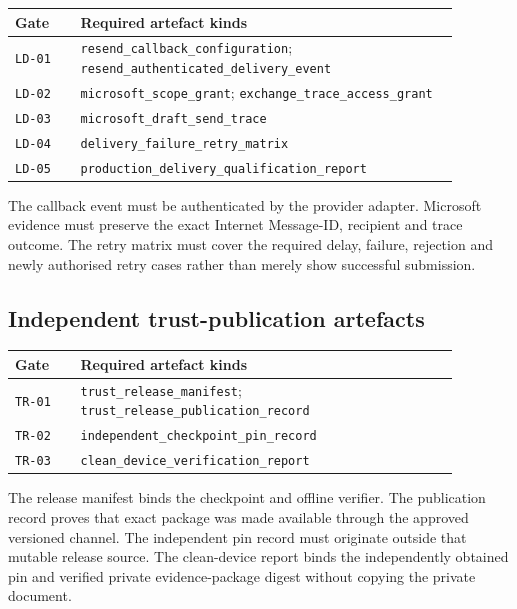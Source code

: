 \begin{center}
\begin{tabular}{p{0.13\linewidth}p{0.75\linewidth}}
\hline
\textbf{Gate} & \textbf{Required artefact kinds} \\
\hline
\texttt{LD-01} & \texttt{resend\_callback\_configuration};
\texttt{resend\_authenticated\_delivery\_event} \\
\texttt{LD-02} & \texttt{microsoft\_scope\_grant};
\texttt{exchange\_trace\_access\_grant} \\
\texttt{LD-03} & \texttt{microsoft\_draft\_send\_trace} \\
\texttt{LD-04} & \texttt{delivery\_failure\_retry\_matrix} \\
\texttt{LD-05} & \texttt{production\_delivery\_qualification\_report} \\
\hline
\end{tabular}
\end{center}

The callback event must be authenticated by the provider adapter.  Microsoft
evidence must preserve the exact Internet Message-ID, recipient and trace outcome.
The retry matrix must cover the required delay, failure, rejection and newly
authorised retry cases rather than merely show successful submission.

\subsection{Independent trust-publication artefacts}

\begin{center}
\begin{tabular}{p{0.13\linewidth}p{0.75\linewidth}}
\hline
\textbf{Gate} & \textbf{Required artefact kinds} \\
\hline
\texttt{TR-01} & \texttt{trust\_release\_manifest};
\texttt{trust\_release\_publication\_record} \\
\texttt{TR-02} & \texttt{independent\_checkpoint\_pin\_record} \\
\texttt{TR-03} & \texttt{clean\_device\_verification\_report} \\
\hline
\end{tabular}
\end{center}

The release manifest binds the checkpoint and offline verifier.  The publication
record proves that exact package was made available through the approved versioned
channel.  The independent pin record must originate outside that mutable release
source.  The clean-device report binds the independently obtained pin and verified
private evidence-package digest without copying the private document.

